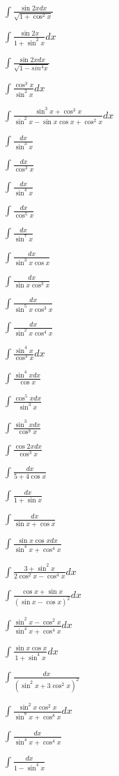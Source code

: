 \begin{multicols}{2}
$\displaystyle \int \frac{\sin 2x dx}{\sqrt{1+\cos^2 x}}$

$\displaystyle \int \frac{\sin 2x}{1+\sin^2 x}dx$

$\displaystyle \int \frac{\sin 2x dx}{\sqrt{1-sin^4 x}}$

$\displaystyle \int \frac{\cos^3 x}{\sin^2 x}dx$

$\displaystyle \int \frac{\sin^3 x+\cos^3 x}{\sin^2 x - \sin x \cos x + \cos^2 x}dx$

$\displaystyle \int \frac{dx}{\sin^3 x}$

$\displaystyle \int \frac{dx}{\cos^3 x}$

$\displaystyle \int \frac{dx}{\sin^4 x}$

$\displaystyle \int \frac{dx}{\cos^5 x}$

$\displaystyle \int \frac{dx}{\sin^7 x}$

$\displaystyle \int \frac{dx}{\sin^3 x \cos x}$

$\displaystyle \int \frac{dx}{\sin x \cos^3 x}$

$\displaystyle \int \frac{dx}{\sin^5 x \cos^3 x}$

$\displaystyle \int \frac{dx}{\sin^2 x \cos^4 x}$

$\displaystyle \int \frac{\sin^4 x}{\cos^3 x}dx$

$\displaystyle \int \frac{\sin^4 x dx}{\cos x}$

$\displaystyle \int \frac{\cos^5 x dx}{\sin^3 x}$

$\displaystyle \int \frac{\sin^3 x dx}{\cos^8 x}$

$\displaystyle \int \frac{\cos 2x dx}{\cos^3 x}$

$\displaystyle \int \frac{dx}{5+4\cos x}$

$\displaystyle \int \frac{dx}{1+\sin x}$

$\displaystyle \int \frac{dx}{\sin x + \cos x}$

$\displaystyle \int \frac{\sin x \cos x dx}{\sin^4 x + \cos^4 x}$

$\displaystyle \int \frac{3+\sin^2 x}{2\cos^2 x - \cos^4 x}dx$

$\displaystyle \int \frac{\cos x + \sin x}{(\sin x - \cos x)^2}dx$

$\displaystyle \int \frac{\sin^2 x - \cos^2 x}{\sin^4 x + \cos^4 x}dx$

$\displaystyle \int \frac{\sin x \cos x}{1+\sin^4 x}dx$

$\displaystyle \int \frac{dx}{(\sin^2 x + 3\cos^2 x)^2}$

$\displaystyle \int \frac{\sin^2 x \cos^2 x}{\sin^8 x + \cos^8 x}dx$

$\displaystyle \int \frac{dx}{\sin^4 x + \cos^4 x}$

$\displaystyle \int \frac{dx}{1-\sin^4 x}$
\end{multicols}

